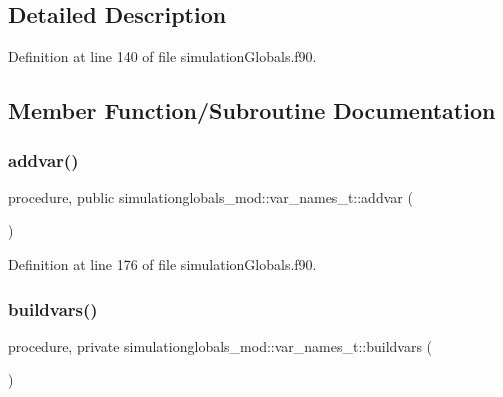 \subsection{Detailed Description}


Definition at line 140 of file simulation\+Globals.\+f90.



\subsection{Member Function/\+Subroutine Documentation}
\mbox{\label{structsimulationglobals__mod_1_1var__names__t_ad8f0446f28faf00796d4952116484509}} 
\subsubsection{\texorpdfstring{addvar()}{addvar()}}
{\footnotesize\ttfamily procedure, public simulationglobals\+\_\+mod\+::var\+\_\+names\+\_\+t\+::addvar (\begin{DoxyParamCaption}{ }\end{DoxyParamCaption})}



Definition at line 176 of file simulation\+Globals.\+f90.

\mbox{\label{structsimulationglobals__mod_1_1var__names__t_a9a30996df58e3c94b86e6661291f4305}} 
\subsubsection{\texorpdfstring{buildvars()}{buildvars()}}
{\footnotesize\ttfamily procedure, private simulationglobals\+\_\+mod\+::var\+\_\+names\+\_\+t\+::buildvars (\begin{DoxyParamCaption}{ }\end{DoxyParamCaption})\hspace{0.3cm}{\ttfamily [private]}}




